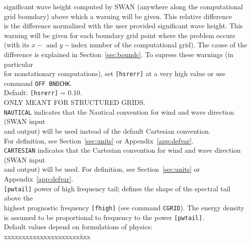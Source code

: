\documentclass[12pt]{book}
\begin{document}
\begin{tabbing}
                   significant wave height computed by SWAN (anywhere along the computational\\
                   grid boundary) above which a warning will be given. This relative difference\\
                   is the difference normalized with the user provided significant wave height. This\\
                   warning will be given for each boundary grid point where the problem occurs\\
                   (with its $x-$ and $y-$index number of the computational grid). The cause of the\\
                   difference is explained in Section~\ref{sec:boundc}. To supress these warnings (in particular\\
                   for nonstationary computations), set {\tt [hsrerr]} at a very high value or use\\
                   command {\tt OFF BNDCHK}.\\
                   Default: {\tt [hsrerr]} = 0.10.\\
                   ONLY MEANT FOR STRUCTURED GRIDS.\-\\
{\tt NAUTICAL}  \> indicates that the Nautical convention for wind and wave direction (SWAN input\+\\
                   and output) will be used instead of the default Cartesian convention.\\
                   For definition, see Section~\ref{sec:units} or Appendix~\ref{app:defvar}.\-\\
{\tt CARTESIAN} \> indicates that the Cartesian convention for wind and wave direction (SWAN input\+\\
                   and output) will be used. For definition, see Section~\ref{sec:units} or Appendix~\ref{app:defvar}.\-\\
{\tt [pwtail]}  \> power of high frequency tail; defines the shape of the spectral tail above the\+\\
                   highest prognostic frequency {\tt [fhigh]} (see command {\tt CGRID}). The energy density\\
                   is assumed to be proportional to frequency to the power {\tt [pwtail]}.\\
                   Default values depend on formulations of physics:\\
                   \pushtabs
                   xxxxxxxxxxxxxxxxxxxxx\=xxx \kill

\end{tabbing}
\end{document}
